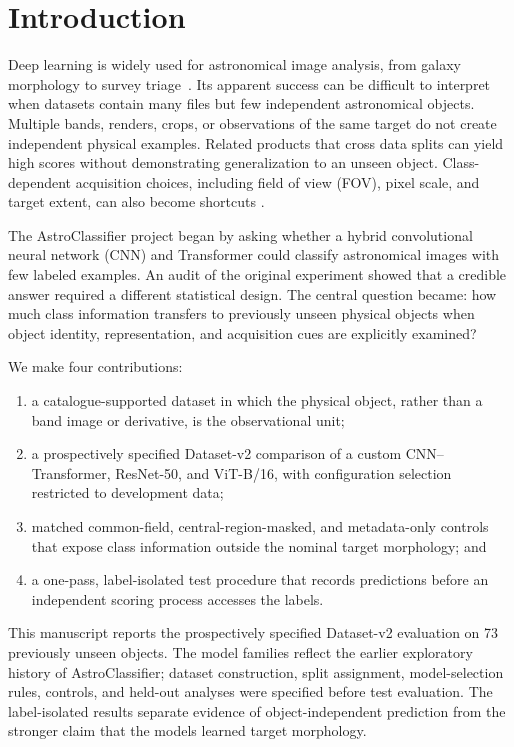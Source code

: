 \documentclass[preprint,12pt,authoryear]{elsarticle}
\begin{document}
\section{Introduction}

Deep learning is widely used for astronomical image analysis, from galaxy morphology
to survey triage~\cite{dieleman2015,huertas2018,baron2019machine}. Its apparent
success can be difficult to interpret when datasets contain many files but few
independent astronomical objects. Multiple bands, renders, crops, or observations of
the same target do not create independent physical examples. Related products that
cross data splits can yield high scores without demonstrating generalization to an
unseen object. Class-dependent acquisition choices, including field of view (FOV),
pixel scale, and target extent, can also become shortcuts
\cite{geirhos2020shortcut,kapoor2023leakage}.

The AstroClassifier project began by asking whether a hybrid convolutional neural
network (CNN) and Transformer could classify astronomical images with few labeled
examples. An audit of the original experiment showed that a credible answer required
a different statistical design. The central question became: how much class
information transfers to previously unseen physical objects when object identity,
representation, and acquisition cues are explicitly examined?

We make four contributions:
\begin{enumerate}
\item a catalogue-supported dataset in which the physical object, rather than a band
image or derivative, is the observational unit;
\item a prospectively specified Dataset-v2 comparison of a custom CNN--Transformer,
ResNet-50, and ViT-B/16,
with configuration selection restricted to development data;
\item matched common-field, central-region-masked, and metadata-only controls that expose
class information outside the nominal target morphology; and
\item a one-pass, label-isolated test procedure that records predictions before an
independent scoring process accesses the labels.
\end{enumerate}

This manuscript reports the prospectively specified Dataset-v2 evaluation on 73
previously unseen objects. The model families reflect the earlier exploratory history
of AstroClassifier; dataset construction, split assignment, model-selection rules,
controls, and held-out analyses were specified before test evaluation. The
label-isolated results separate evidence of object-independent prediction from the
stronger claim that the models learned target morphology.
\end{document}
